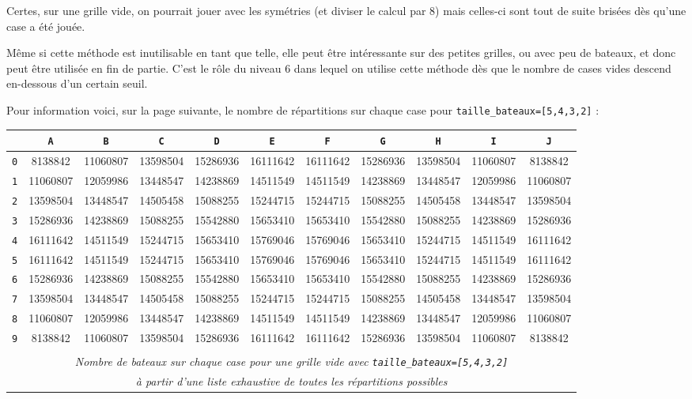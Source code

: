 Certes, sur une grille vide, on pourrait jouer avec les symétries (et diviser le calcul par $8$) mais celles-ci sont tout de suite brisées dès qu'une case a été jouée.

Même si cette méthode est inutilisable en tant que telle, elle peut être intéressante sur des petites grilles, ou avec peu de bateaux, et donc peut être utilisée en fin de partie. C'est le rôle du niveau 6 dans lequel on utilise cette méthode dès que le nombre de cases vides descend en-dessous d'un certain seuil.

Pour information voici, sur la page suivante, le nombre de répartitions sur chaque case pour \texttt{taille\_bateaux=[5,4,3,2]} :


\begin{center}
\begin{adjustbox}{angle=90}
\begin{tabular}{|c|c|c|c|c|c|c|c|c|c|c|}
\hline
& \texttt{A} & \texttt{B} & \texttt{C} & \texttt{D} & \texttt{E} & \texttt{F} & \texttt{G} & \texttt{H} & \texttt{I} & \texttt{J} \\
\hline
\texttt{0} & 8138842 & 11060807 & 13598504 & 15286936 & 16111642 & 16111642 & 15286936 & 13598504 & 11060807 & 8138842\\
\hline
\texttt{1} & 11060807 & 12059986 & 13448547 & 14238869 & 14511549 & 14511549 & 14238869 & 13448547 & 12059986 & 11060807\\
\hline
\texttt{2} & 13598504 & 13448547 & 14505458 & 15088255 & 15244715 & 15244715 & 15088255 & 14505458 & 13448547 & 13598504\\
\hline
\texttt{3} & 15286936 & 14238869 & 15088255 & 15542880 & 15653410 & 15653410 & 15542880 & 15088255 & 14238869 & 15286936\\
\hline
\texttt{4} & 16111642 & 14511549 & 15244715 & 15653410 & 15769046 & 15769046 & 15653410 & 15244715 & 14511549 & 16111642\\
\hline
\texttt{5} & 16111642 & 14511549 & 15244715 & 15653410 & 15769046 & 15769046 & 15653410 & 15244715 & 14511549 & 16111642\\
\hline
\texttt{6} & 15286936 & 14238869 & 15088255 & 15542880 & 15653410 & 15653410 & 15542880 & 15088255 & 14238869 & 15286936\\
\hline
\texttt{7} & 13598504 & 13448547 & 14505458 & 15088255 & 15244715 & 15244715 & 15088255 & 14505458 & 13448547 & 13598504\\
\hline
\texttt{8} & 11060807 & 12059986 & 13448547 & 14238869 & 14511549 & 14511549 & 14238869 & 13448547 & 12059986 & 11060807\\
\hline
\texttt{9} & 8138842 & 11060807 & 13598504 & 15286936 & 16111642 & 16111642 & 15286936 & 13598504 & 11060807 & 8138842\\
\hline
\multicolumn{11}{c}{}\\
\multicolumn{11}{c}{\textit{Nombre de bateaux sur chaque case pour une grille vide avec \texttt{taille\_bateaux=[5,4,3,2]}}}\\
\multicolumn{11}{c}{\textit{à partir d'une liste exhaustive de toutes les répartitions possibles}}
\end{tabular}
\end{adjustbox}
\end{center}

